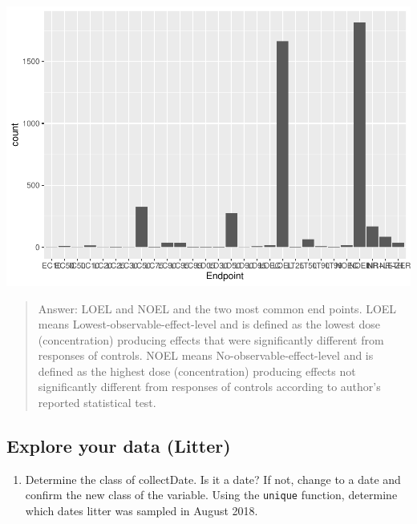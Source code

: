 \documentclass[]{article}
\newenvironment{Shaded}{\begin{snugshade}}{\end{snugshade}}
\newcommand{\KeywordTok}[1]{\textcolor[rgb]{0.13,0.29,0.53}{\textbf{#1}}}
\newcommand{\OperatorTok}[1]{\textcolor[rgb]{0.81,0.36,0.00}{\textbf{#1}}}
\newcommand{\NormalTok}[1]{#1}
\providecommand{\tightlist}{%
  \setlength{\itemsep}{0pt}\setlength{\parskip}{0pt}}
\begin{document}
\includegraphics{A03_DataExploration_files/figure-latex/unnamed-chunk-8-1.pdf}

\begin{quote}
Answer: LOEL and NOEL and the two most common end points. LOEL means
Lowest-observable-effect-level and is defined as the lowest dose
(concentration) producing effects that were significantly different from
responses of controls. NOEL means No-observable-effect-level and is
defined as the highest dose (concentration) producing effects not
significantly different from responses of controls according to author's
reported statistical test.
\end{quote}

\subsection{Explore your data (Litter)}\label{explore-your-data-litter}

\begin{enumerate}
\def\labelenumi{\arabic{enumi}.}
\setcounter{enumi}{11}
\tightlist
\item
  Determine the class of collectDate. Is it a date? If not, change to a
  date and confirm the new class of the variable. Using the
  \texttt{unique} function, determine which dates litter was sampled in
  August 2018.
\end{enumerate}

\begin{Shaded}
\end{Shaded}
\end{document}
